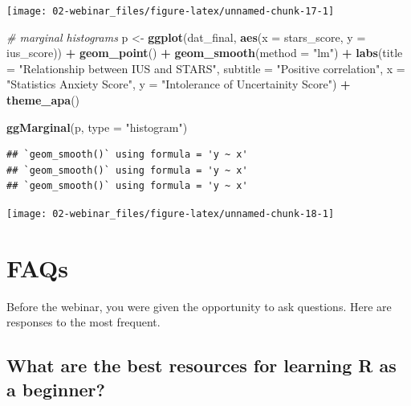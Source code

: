 \documentclass[
  oneside]{book}
\newenvironment{Shaded}{\begin{snugshade}}{\end{snugshade}}
\newcommand{\AttributeTok}[1]{\textcolor[rgb]{0.13,0.29,0.53}{#1}}
\newcommand{\CommentTok}[1]{\textcolor[rgb]{0.56,0.35,0.01}{\textit{#1}}}
\newcommand{\FunctionTok}[1]{\textcolor[rgb]{0.13,0.29,0.53}{\textbf{#1}}}
\newcommand{\NormalTok}[1]{#1}
\newcommand{\OtherTok}[1]{\textcolor[rgb]{0.56,0.35,0.01}{#1}}
\newcommand{\SpecialCharTok}[1]{\textcolor[rgb]{0.81,0.36,0.00}{\textbf{#1}}}
\newcommand{\StringTok}[1]{\textcolor[rgb]{0.31,0.60,0.02}{#1}}
\begin{document}
\begin{center}\texttt{[image: 02-webinar\_files/figure-latex/unnamed-chunk-17-1]} \end{center}

\begin{Shaded}
\begin{Highlighting}[]
\CommentTok{\# marginal histograms}
\NormalTok{p }\OtherTok{\textless{}{-}} \FunctionTok{ggplot}\NormalTok{(dat\_final, }\FunctionTok{aes}\NormalTok{(}\AttributeTok{x =}\NormalTok{ stars\_score, }\AttributeTok{y =}\NormalTok{ ius\_score)) }\SpecialCharTok{+}
  \FunctionTok{geom\_point}\NormalTok{() }\SpecialCharTok{+}
  \FunctionTok{geom\_smooth}\NormalTok{(}\AttributeTok{method =} \StringTok{"lm"}\NormalTok{) }\SpecialCharTok{+}
  \FunctionTok{labs}\NormalTok{(}\AttributeTok{title =} \StringTok{"Relationship between IUS and STARS"}\NormalTok{,}
       \AttributeTok{subtitle =} \StringTok{"Positive correlation"}\NormalTok{,}
       \AttributeTok{x =} \StringTok{"Statistics Anxiety Score"}\NormalTok{,}
       \AttributeTok{y =} \StringTok{"Intolerance of Uncertainity Score"}\NormalTok{) }\SpecialCharTok{+}
  \FunctionTok{theme\_apa}\NormalTok{() }

\FunctionTok{ggMarginal}\NormalTok{(p, }\AttributeTok{type =} \StringTok{"histogram"}\NormalTok{)}
\end{Highlighting}
\end{Shaded}

\begin{verbatim}
## `geom_smooth()` using formula = 'y ~ x'
## `geom_smooth()` using formula = 'y ~ x'
## `geom_smooth()` using formula = 'y ~ x'
\end{verbatim}

\begin{center}\texttt{[image: 02-webinar\_files/figure-latex/unnamed-chunk-18-1]} \end{center}

\section{FAQs}\label{faqs}

Before the webinar, you were given the opportunity to ask questions. Here are responses to the most frequent.

\subsection{What are the best resources for learning R as a beginner?}\label{what-are-the-best-resources-for-learning-r-as-a-beginner}
\end{document}
